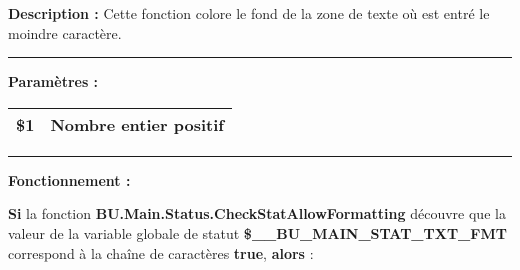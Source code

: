 \documentclass[a4paper,10pt]{article}
\begin{document}
    \setlength{\parskip}{1em}

    \begin{justify}
        \textbf{Description :} Cette fonction colore le fond de la zone de texte où est entré le moindre caractère.
    \end{justify}


    \par\noindent\rule{\textwidth}{0.4pt}

    \begin{justify}
        \textbf{Paramètres :}

        \begin{tabular}{|l|l|}
            \hline
            \textbf{\color{orange}\$1} & Nombre entier positif\\
            \hline
        \end{tabular}
    \end{justify}


    \par\noindent\rule{\textwidth}{0.4pt}

    \begin{justify}
        \textbf{Fonctionnement :}

        \textbf{\color{cond}Si} la fonction \textbf{\color{func}BU.Main.Status.CheckStatAllowFormatting} découvre que la valeur de la variable globale de statut \textbf{\color{vars}\$\_\_BU\_MAIN\_STAT\_TXT\_FMT} correspond à la chaîne de caractères \textbf{true}, \textbf{\color{cond}alors} :
    \end{justify}
\end{document}
